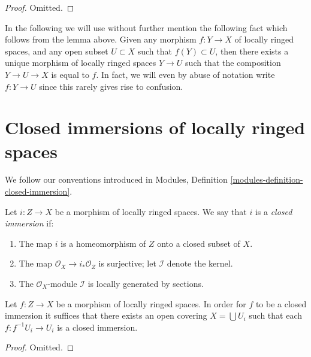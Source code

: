 \begin{proof}
Omitted.
\end{proof}

\noindent
In the following we will use without further mention the following
fact which follows from the lemma above. Given any morphism
$f : Y \to X$ of locally ringed spaces, and any open subset
$U \subset X$ such that $f(Y) \subset U$, then there exists
a unique morphism of locally ringed spaces $Y \to U$ such that
the composition $Y \to U \to X$ is equal to $f$. In fact, we will
even by abuse of notation write $f : Y \to U$ since this rarely
gives rise to confusion.









\section{Closed immersions of locally ringed spaces}
\label{section-closed-immersion}

\noindent
We follow our conventions introduced in
Modules, Definition \ref{modules-definition-closed-immersion}.

\begin{definition}
\label{definition-closed-immersion-locally-ringed-spaces}
Let $i : Z \to X$ be a morphism of locally ringed spaces.
We say that $i$ is a {\it closed immersion} if:
\begin{enumerate}
\item The map $i$ is a homeomorphism of $Z$ onto a closed subset of $X$.
\item The map $\mathcal{O}_X \to i_*\mathcal{O}_Z$ is surjective;
let $\mathcal{I}$ denote the kernel.
\item The $\mathcal{O}_X$-module $\mathcal{I}$
is locally generated by sections.
\end{enumerate}
\end{definition}

\begin{lemma}
\label{lemma-closed-local-target}
Let $f : Z \to X$ be a morphism of locally ringed spaces.
In order for $f$ to be a closed immersion it suffices
that there exists an open covering $X = \bigcup U_i$ such
that each $f : f^{-1}U_i \to U_i$ is a closed immersion.
\end{lemma}

\begin{proof}
Omitted.
\end{proof}

